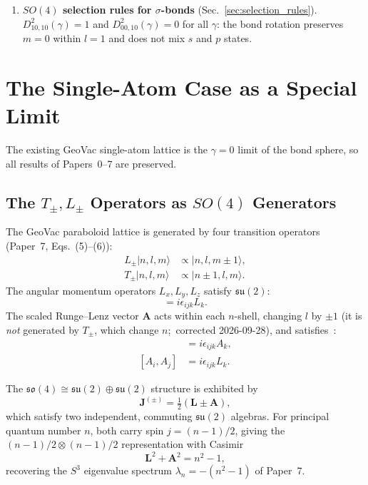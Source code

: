 \documentclass[aps,pra,twocolumn,superscriptaddress,longbibliography]{revtex4-2}
\theoremstyle{remark}
\theoremstyle{plain}
\begin{document}
\begin{enumerate}
\item \textbf{$SO(4)$ selection rules for $\sigma$-bonds}
(Sec.~\ref{sec:selection_rules}).
$D^2_{10,10}(\gamma) = 1$ and $D^2_{00,10}(\gamma) = 0$ for all
$\gamma$: the bond rotation preserves $m = 0$ within $l = 1$ and does
not mix $s$ and $p$ states.

\end{enumerate}


\section{The Single-Atom Case as a Special Limit}
\label{sec:single_atom}

The existing GeoVac single-atom lattice is the $\gamma = 0$ limit of
the bond sphere, so all results of Papers~0--7 are preserved.

\subsection{The $T_\pm, L_\pm$ Operators as $SO(4)$ Generators}

The GeoVac paraboloid lattice is generated by four transition operators
(Paper~7, Eqs.~(5)--(6)):
\begin{align}
L_\pm |n, l, m\rangle &\propto |n, l, m \pm 1\rangle, \\
T_\pm |n, l, m\rangle &\propto |n \pm 1, l, m\rangle.
\end{align}
The angular momentum operators $L_x, L_y, L_z$ satisfy
$\mathfrak{su}(2)$:
\begin{equation}
[L_i, L_j] = i\epsilon_{ijk} L_k.
\label{eq:su2_angular}
\end{equation}
The scaled Runge--Lenz vector $\mathbf{A}$ acts within each $n$-shell,
changing $l$ by $\pm 1$ (it is \emph{not} generated by $T_\pm$, which
change $n$;\ corrected 2026-09-28), and satisfies~\cite{Bander1966}:
\begin{align}
[L_i, A_j] &= i\epsilon_{ijk} A_k, \label{eq:LA_comm} \\
[A_i, A_j] &= i\epsilon_{ijk} L_k. \label{eq:AA_comm}
\end{align}

The $\mathfrak{so}(4) \cong \mathfrak{su}(2) \oplus \mathfrak{su}(2)$
structure is exhibited by
\begin{equation}
\mathbf{J}^{(\pm)} = \tfrac{1}{2}(\mathbf{L} \pm \mathbf{A}),
\label{eq:Jpm_def}
\end{equation}
which satisfy two independent, commuting $\mathfrak{su}(2)$ algebras.
For principal quantum number $n$, both carry spin $j = (n-1)/2$,
giving the $(n-1)/2 \otimes (n-1)/2$ representation with Casimir
\begin{equation}
\mathbf{L}^2 + \mathbf{A}^2 = n^2 - 1,
\label{eq:casimir}
\end{equation}
recovering the $S^3$ eigenvalue spectrum $\lambda_n = -(n^2 - 1)$
of Paper~7.
\end{document}
